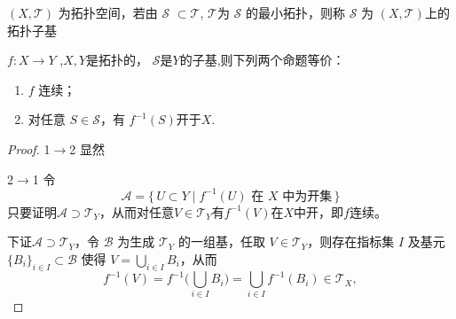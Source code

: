 \documentclass[lang=cn,a4paper,newtx,figureplace=section,tableplace=section]{elegantbook}
\begin{document}
\begin{definition}[拓扑子基]\label{def:subbasis}$(X,\mathcal{T})$ 为拓扑空间，若由 $\mathcal S$ $\subset\mathcal{T}$, $\mathcal{T}$为 $\mathcal S$ 的最小拓扑，则称 $\mathcal S$ 为 $(X,\mathcal{T})$上的拓扑子基
\end{definition}
\begin{proposition}
    $f:X\to Y$ ,$X,Y$是拓扑的， $\mathcal S$是$Y$的子基,则下列两个命题等价：\begin{enumerate} \item $f$ 连续； \item 对任意 $S\in\mathcal S$，有 $f^{-1}(S)$开于$X$. 
    \end{enumerate}
\end{proposition}
\begin{proof}
    1$\to$2 显然

    2$\to$1 令
\begin{equation}
\mathcal A=\{\,U\subset Y\mid f^{-1}(U)\text{ 在 }X\text{ 中为开集}\,\}
\end{equation}
只要证明$\mathcal A\supset\mathcal{T}_{Y}$，从而对任意$V\in\mathcal{T}_{Y}$有$f^{-1}(V)$在$X$中开，即$f$连续。

下证$\mathcal A\supset\mathcal{T}_{Y}$，令 $\mathcal B$ 为生成 $\mathcal{T}_{Y}$ 的一组基，任取 $V\in\mathcal{T}_{Y}$，则存在指标集 $I$ 及基元 $\{B_i\}_{i\in I}\subset\mathcal B$ 使得 $V=\bigcup_{i\in I}B_i$，从而
\begin{equation}
f^{-1}(V)=f^{-1}\Big(\bigcup_{i\in I}B_i\Big)=\bigcup_{i\in I}f^{-1}(B_i)\in\mathcal{T}_{X},
\end{equation}

\end{proof}
\end{document}
